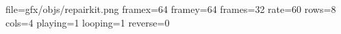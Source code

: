 file=gfx/objs/repairkit.png
framex=64
framey=64
frames=32
rate=60
rows=8
cols=4
playing=1
looping=1
reverse=0